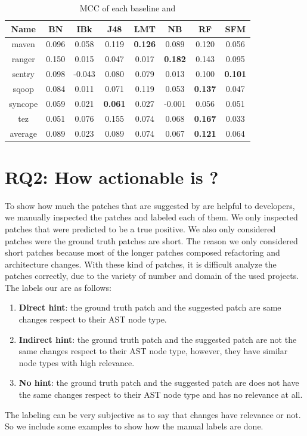 \begin{table}[!ht]
\caption{MCC of each baseline and \simfinmo}
\centering
\begin{tabular}{|c|c|c|c|c|c|c|c|}
\hline
Name& BN & IBk & J48 & LMT & NB & RF & SFM \\ \hline
maven & 0.096 & 0.058 & 0.119 & \textbf{0.126} & 0.089 & 0.120 & 0.056 \\ \hline
ranger & 0.150 & 0.015 & 0.047 & 0.017 & \textbf{0.182} & 0.143 & 0.095 \\ \hline
sentry & 0.098 & -0.043 & 0.080 & 0.079 & 0.013 & 0.100 & \textbf{0.101} \\ \hline
sqoop & 0.084 & 0.011 & 0.071 & 0.119 & 0.053 & \textbf{0.137} & 0.047 \\ \hline
syncope & 0.059 & 0.021 & \textbf{0.061} & 0.027 & -0.001 & 0.056 & 0.051 \\ \hline
tez & 0.051 & 0.076 & 0.155 & 0.074 & 0.068 & \textbf{0.167} & 0.033 \\ \hline
average & 0.089 & 0.023 & 0.089 & 0.074 & 0.067 & \textbf{0.121} & 0.064 \\ \hline
\end{tabular}%
\label{tab:mcc}
\end{table}


\section{RQ2: How actionable is {\simfinmo}?}
To show how much the patches that are suggested by {\simfinmo} are helpful to developers, we manually inspected the patches and labeled each of them.
We only inspected patches that were predicted to be a true positive.
We also only considered patches were the ground truth patches are short. 
The reason we only considered short patches because most of the longer patches composed refactoring and architecture changes.
With these kind of patches, it is difficult analyze the patches correctly, due to the variety of number and domain of the used projects.
The labels our are as follows:
\begin{enumerate}
    \item \textbf{Direct hint}: the ground truth patch and the suggested patch are same changes respect to their AST node type.
    \item \textbf{Indirect hint}: the ground truth patch and the suggested patch are not the same changes respect to their AST node type, however, they have similar node types with high relevance.
    \item \textbf{No hint}: the ground truth patch and the suggested patch are does not have the same changes respect to their AST node type and has no relevance at all.
\end{enumerate}
The labeling can be very subjective as to say that changes have relevance or not.
So we include some examples to show how the manual labels are done.

